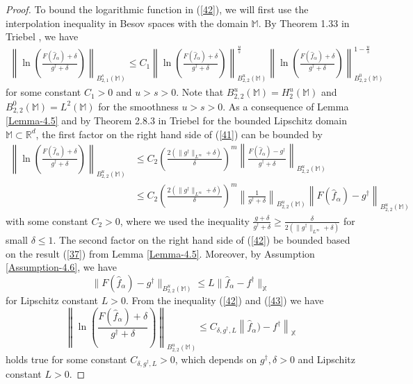 \documentclass[10pt]{iopart}
\begin{document}
\begin{proof}
To bound the logarithmic function in (\ref{42}), we  will first use the interpolation inequality in Besov spaces with the domain $\mathbb{M}$. By Theorem 1.33 in Triebel \cite{Triebel2008}, we have
\begin{align}\label{41}
 \left\|\ln\left(\frac{F(\widehat{f}_{\alpha})+\delta}{g^{\dagger}+\delta}\right)\right\|_{B_{2,1}^{s}(\mathbb{M})} \leq C_{1}
 \left\|\ln\left(\frac{F(\widehat{f}_{\alpha})+\delta}{g^{\dagger}+\delta}\right)\right\|_{B_{2,2}^{u}(\mathbb{M})}^{\frac{u}{s}}
 \left\|\ln\left(\frac{F(\widehat{f}_{\alpha})+\delta}{g^{\dagger}+\delta}\right)\right\|_{B_{2,2}^{0}(\mathbb{M})}^{1-\frac{u}{s}}
 \end{align}
for some constant $C_{1}>0$ and $u>s>0$.
Note that $B_{2,2}^{u}(\mathbb{M})=H_{2}^{u}(\mathbb{M})$ and $B_{2,2}^{0}(\mathbb{M})=L^{2}(\mathbb{M})$ for the smoothness $u>s>0$.
As a consequence of Lemma \ref{Lemma-4.5} and by Theorem 2.8.3 in Triebel \cite{Triebel1983} for the bounded Lipschitz domain $\mathbb{M}\subset\mathbb{R}^{d}$, 
 the first factor on the right hand side of (\ref{41}) can be bounded by
\begin{align}\label{42}
 \left\|\ln\left(\frac{F(\widehat{f}_{\alpha})+\delta}{g^{\dagger}+\delta}\right)\right\|_{B_{2,2}^{u}(\mathbb{M})} 
&\leq C_{2}\left(\frac{2(\|g^{\dagger}\|_{L^{\infty}}+\delta)}{\delta}\right)^{m}\left\|\frac{F(\widehat{f}_{\alpha})-g^{\dagger}}{g^{\dagger}+\delta}\right\|_{B_{2,2}^{u}(\mathbb{M})}\nonumber\\
&\leq C_{2}\left(\frac{2(\|g^{\dagger}\|_{L^{\infty}}+\delta)}{\delta}\right)^{m}\left\|\frac{1}{g^{\dagger}+\delta}\right\|_{B_{2,2}^{u}(\mathbb{M})}
\left\|F(\widehat{f}_{\alpha})-g^{\dagger}\right\|_{B_{2,2}^{u}(\mathbb{M})}
\end{align}
with some constant $C_{2}>0$, 
where we used the inequality $\frac{g+\delta}{g^{\dagger}+\delta}\geq \frac{\delta}{2(\|g^{\dagger}\|_{L^{\infty}}+\delta)}$ for small $\delta\leq 1$. 
The second factor on the right hand side of (\ref{42}) be bounded based on the result (\ref{37})  from Lemma \ref{Lemma-4.5}. Moreover, by Assumption \ref{Assumption-4.6}, we have
\begin{equation}\label{43}
\|F(\widehat{f}_{\alpha})-g^{\dagger}\|_{B_{2,2}^{u}(\mathbb{M})}\leq L \|\widehat{f}_{\alpha}-f^{\dagger}\|_{\mathbb{X}}
\end{equation}
for Lipschitz constant $L>0$. From the inequality (\ref{42}) and  (\ref{43}) we have
\begin{equation}\label{44}
 \left\|\ln\left(\frac{F(\widehat{f}_{\alpha})+\delta}{g^{\dagger}+\delta}\right)\right\|_{B_{2,2}^{u}(\mathbb{M})} \leq C_{\delta, g^{\dagger}, L}\left\|\widehat{f}_{\alpha})-f^{\dagger}\right\|_{\mathbb{X}}
  \end{equation}
holds true for some constant $C_{\delta, g^{\dagger}, L}>0$, which depends on $g^{\dagger}, \delta>0$ and Lipschitz constant $L>0$.  


\end{proof}
\end{document}
